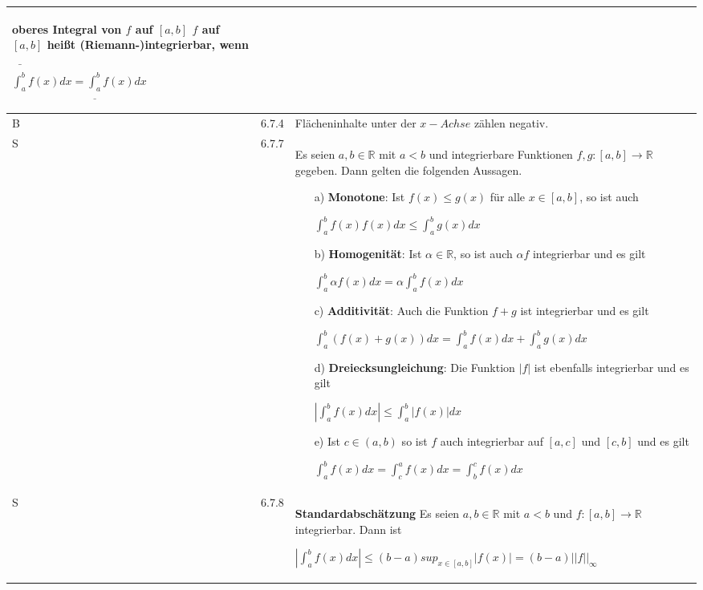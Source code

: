\begin{longtable}{p{0.75cm} p{1cm} p{16cm}}
                        \textbf{oberes Integral} von $f$ auf $[a,b]$ \hfill \break
                        $f$ auf $[a,b]$ heißt (Riemann-)integrierbar, wenn \hfill \break
                        \centerline{$\bar{\int^b_a}f(x) dx = \underline{\int_a^b} f(x) dx$}\\
        \midrule
        B   & 6.7.4 &   Flächeninhalte unter der $x-Achse$ zählen negativ. \\
        \midrule
        S   & 6.7.7 &   Es seien $a, b \in \mathbb{R}$ mit $a < b$ und integrierbare Funktionen $f,g: [a,b] \rightarrow \mathbb{R}$ gegeben.
                        Dann gelten die folgenden Aussagen.
                        \begin{itemize}[topsep=-0.5cm]
                            \item[a)] \textbf{Monotone}: Ist $f(x) \leq g(x)$ für alle $x \in [a,b]$, so ist auch \hfill \break
                                        \centerline{$ \int_a^b f(x) f(x) dx \leq \int_a^b g(x) dx$}
                            \item[b)] \textbf{Homogenität}: Ist $\alpha \in \mathbb{R}$, so ist auch $\alpha f$ integrierbar und es gilt \hfill \break
                                        \centerline{$ \int_a^b\alpha f(x) dx = \alpha \int_a^bf(x) dx $}
                            \item[c)] \textbf{Additivität}: Auch die Funktion $f+g$ ist integrierbar und es gilt \hfill \break
                                        \centerline{$ \int_a^b (f(x)+g(x))dx= \int_a^bf(x) dx + \int_a^b g(x) dx $}
                            \item[d)] \textbf{Dreiecksungleichung}: Die Funktion $|f|$ ist ebenfalls integrierbar und es gilt \hfill \break
                                        \centerline{$ |\int_a^bf(x)dx| \leq \int_a^b |f(x)| dx $}
                            \item[e)] Ist $c \in (a,b)$ so ist $f$ auch integrierbar auf $[a,c]$ und $[c,b]$ und es gilt \hfill \break
                                        \centerline{$ \int_a^bf(x) dx = \int_c^a f(x) dx = \int_b^c f(x) dx $} 
                        \end{itemize} \vspace{-0cm} \\
        \midrule
        S   & 6.7.8 &   \textbf{Standardabschätzung} \hfill \break
                        Es seien $a,b \in \mathbb{R}$ mit $a < b$ und $f: [a,b] \rightarrow \mathbb{R}$ integrierbar. Dann ist \hfill \break
                        \centerline{$ |\int_a^bf(x) dx| \leq (b-a) sup_{x\in[a,b]} |f(x)| = (b-a)||f||_{\infty} $} \\

\end{longtable}
